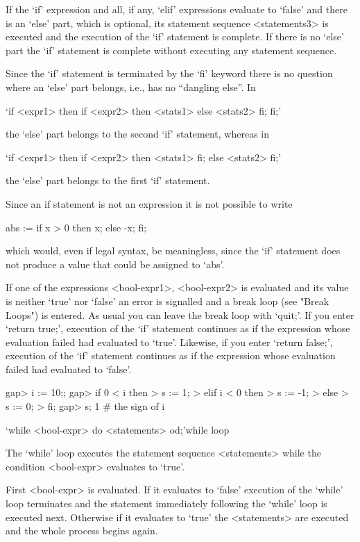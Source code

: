 {If the `if' expression and all, if any, `elif' expressions evaluate to
`false' and there is an `else' part, which is optional, its statement
sequence <statements3> is executed  and the  execution of  the `if'
statement is complete. If there is no `else' part the `if' statement is
complete without executing any statement sequence.

Since the `if' statement is terminated by the `fi' keyword there is no
question where an `else' part belongs,
i.e., {\GAP} has no ``dangling else''.
In

`if <expr1> then if <expr2> then <stats1> else <stats2> fi; fi;'

the `else' part belongs to the second  `if' statement, whereas in

`if <expr1> then if <expr2> then <stats1> fi; else <stats2> fi;'

the `else' part belongs to the first `if' statement.

Since an if statement is not an expression it is not possible to write

\begintt
abs := if x > 0 then x; else -x; fi;
\endtt

which would, even if legal syntax, be  meaningless, since the `if'
statement does not produce a value that could be assigned to `abs'.

If one of the expressions <bool-expr1>, <bool-expr2> is evaluated
and its value is neither `true' nor `false' an error is signalled
and a break loop (see "Break Loops") is entered. As usual you
can leave  the break loop with `quit;'.  If you enter `return true;',
execution of the `if' statement continues as if the expression whose
evaluation  failed had evaluated to `true'.   Likewise, if you enter
`return false;', execution of the `if' statement continues as if the
expression whose evaluation failed had evaluated to `false'.

\beginexample
gap> i := 10;;
gap> if 0 < i then
>    s := 1;
>  elif i < 0 then
>    s := -1;
>  else
>    s := 0;
>  fi;
gap> s;
1    # the sign of i
\endexample



\>`while <bool-expr> do <statements> od;'{while loop}

The `while' loop executes the statement sequence <statements> while the
condition <bool-expr> evaluates to `true'.

First <bool-expr> is evaluated. If it evaluates to `false' execution of
the `while' loop terminates and the statement immediately following the
`while' loop is executed next. Otherwise if it evaluates to `true' the
<statements> are executed and the whole process begins again.

}
